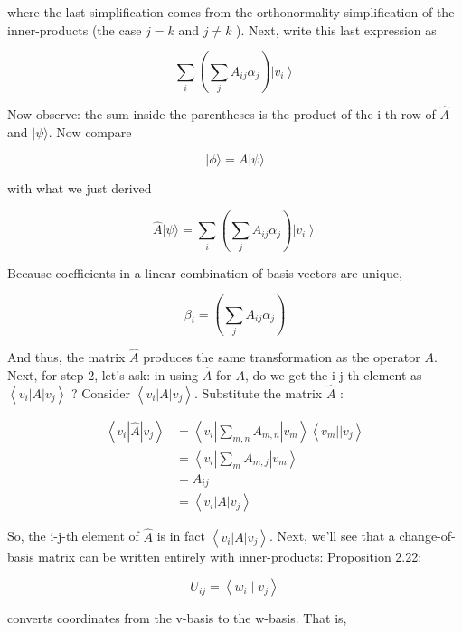 \documentclass[main.tex]{subfiles}
\begin{document}
    where the last simplification comes from the orthonormality simplification of the inner-products (the case $j=k$ and $j \neq k$ ). Next, write this last expression as
    
    $$
    \sum_{i}\left(\sum_{j} A_{i j} \alpha_{j}\right)\left|v_{i}\right\rangle
    $$
    
    Now observe: the sum inside the parentheses is the product of the i-th row of $\hat{A}$ and $|\psi\rangle$. Now compare
    
    $$
    |\phi\rangle=A|\psi\rangle
    $$
    
    with what we just derived
    
    $$
    \hat{A}|\psi\rangle=\sum_{i}\left(\sum_{j} A_{i j} \alpha_{j}\right)\left|v_{i}\right\rangle
    $$
    
    Because coefficients in a linear combination of basis vectors are unique,
    
    $$
    \beta_{i}=\left(\sum_{j} A_{i j} \alpha_{j}\right)
    $$
    
    And thus, the matrix $\hat{A}$ produces the same transformation as the operator $A$.
    Next, for step 2, let's ask: in using $\hat{A}$ for $A$, do we get the i-j-th element as $\left\langle v_{i}|A| v_{j}\right\rangle$ ? Consider $\left\langle v_{i}|A| v_{j}\right\rangle$. Substitute the matrix $\hat{A}$ :
    
    $$
    \begin{aligned}
    \left\langle v_{i}|\hat{A}| v_{j}\right\rangle &=\left\langle v_{i}\left|\sum_{m, n} A_{m, n}\right| v_{m}\right\rangle\left\langle v_{m}|| v_{j}\right\rangle \\
    &=\left\langle v_{i}\left|\sum_{m} A_{m, j}\right| v_{m}\right\rangle \\
    &=A_{i j} \\
    &=\left\langle v_{i}|A| v_{j}\right\rangle
    \end{aligned}
    $$
    
    So, the i-j-th element of $\hat{A}$ is in fact $\left\langle v_{i}|A| v_{j}\right\rangle$. Next, we'll see that a change-of-basis matrix can be written entirely with inner-products: Proposition 2.22:
    
    $$
    U_{i j}=\left\langle w_{i} \mid v_{j}\right\rangle
    $$
    
    converts coordinates from the v-basis to the w-basis. That is,
    
\end{document}
